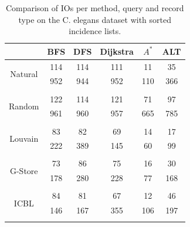 \begin{table}[H]
	\begin{center}
		 \begin{tabular}[c]{c c c c c c} \toprule
			  & BFS & DFS & Dijkstra & $A^*$  & ALT \\ \midrule 
 			\multirow{2}{*}{Natural}  & 114 & 114 & 111 & 11 & 35 \\ 
 				 & 952 & 944 & 952 & 110 & 366 \\ 
 				&&&&& \\[-0.5em]
 			\multirow{2}{*}{Random}  & 122 & 114 & 121 & 71 & 97 \\ 
 				 & 961 & 960 & 957 & 665 & 785 \\ 
 				&&&&& \\[-0.5em]
 			\multirow{2}{*}{Louvain}  & 83 & 82 & 69 & 14 & 17 \\ 
 				 & 222 & 389 & 145 & 60 & 99 \\ 
 				&&&&& \\[-0.5em]
 			\multirow{2}{*}{G-Store}  & 73 & 86 & 75 & 16 & 30 \\ 
 				 & 178 & 280 & 228 & 77 & 168 \\ 
 				&&&&& \\[-0.5em]
 			\multirow{2}{*}{ICBL}  & 84 & 81 & 67 & 12 & 46 \\ 
 				 & 146 & 167 & 355 & 106 & 197 \\ 
 				&&&&& \\[-0.5em]
 					\end{tabular}  
  	 \end{center}
	 \caption{Comparison of IOs per method, query and record type on the C. elegans dataset with sorted incidence lists.}
	 \label{ce-s}
\end{table}

